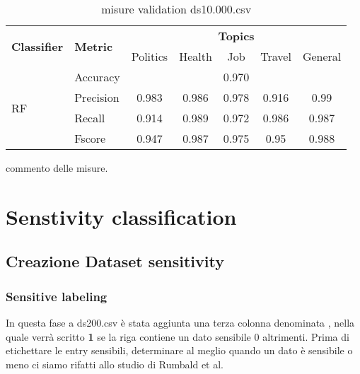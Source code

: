 \begin{table}[h]
\begin{tabular}{|l|l|c|c|c|c|c|}
\hline
\multirow{2}{*}{\textbf{Classifier}} & \multirow{2}{*}{\textbf{Metric}} & \multicolumn{5}{c|}{\textbf{Topics}} \\ \cline{3-7} 
 &  & Politics & Health & Job & Travel & General \\ \hline
\multirow{4}{*}{RF} & Accuracy & \multicolumn{5}{c|}{0.970} \\ \cline{2-7} 
 & Precision & 0.983 & 0.986 & 0.978 & 0.916 & 0.99 \\ \cline{2-7} 
 & Recall & 0.914 & 0.989 & 0.972 & 0.986 & 0.987 \\ \cline{2-7} 
 & Fscore & 0.947 & 0.987 & 0.975 & 0.95 & 0.988 \\ \hline
\end{tabular}
\caption{misure validation ds10.000.csv}
\end{table}
\FloatBarrier
commento delle misure.\newline

\section{Senstivity classification}

\subsection{Creazione Dataset sensitivity}

\subsubsection{Sensitive labeling}
In questa fase a ds200.csv è stata aggiunta una terza colonna denominata , nella quale verrà scritto \textbf{1} se la riga contiene un dato sensibile 0 altrimenti.\newline
Prima di etichettare le entry sensibili, determinare al meglio quando un dato è sensibile o meno ci siamo rifatti allo studio di Rumbald et al.\cite{dataSpectrum}

